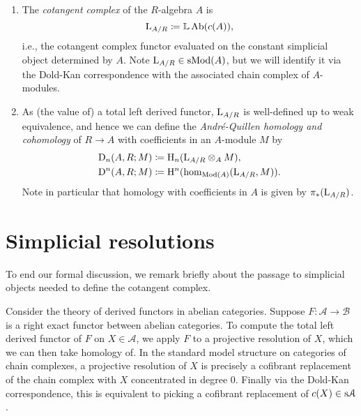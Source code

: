\begin{definitions}
  \begin{enumerate}[leftmargin=*]
  \item The \emph{cotangent complex} of the $R$-algebra
    $A$ is
    \[
    \mathrm{L}_{A/R} \coloneqq \mathbb{L}\operatorname{Ab}(c(A)),
    \]
    i.e., the cotangent complex functor evaluated on the constant
    simplicial object determined by $A$. Note $\mathrm{L}_{A/R} \in
    \mathrm{s}\mathrm{Mod}(A)$, but we will identify it via the Dold-Kan
    correspondence with the associated chain complex of $A$-modules.
  \item As (the value of) a total left derived functor, $\mathrm{L}_{A/R}$
    is well-defined up to weak equivalence, and hence we can define
    the \emph{Andr\'e-Quillen homology and cohomology} of $R \to A$
    with coefficients in an $A$-module $M$ by
    \begin{align*}
    \mathrm{D}_n(A,R;M) &\coloneqq \mathrm{H}_n(\mathrm{L}_{A/R} \otimes_A M),\\ \mathrm{D}^n(A,R;M)
    &\coloneqq \mathrm{H}^n(\operatorname{hom}_{\mathrm{Mod}(A)}(\mathrm{L}_{A/R}, M)).
    \end{align*}
    Note in particular that homology with coefficients in $A$ is given
    by $\pi_*(\mathrm{L}_{A/R})$.
  \end{enumerate}
\end{definitions}


\section{Simplicial resolutions}

To end our formal discussion, we remark briefly about the passage to
simplicial objects needed to define the cotangent complex.

\renewcommand{\A}{\mathcal{A}}
\renewcommand{\B}{\mathcal{B}}

Consider the theory of derived functors in abelian categories. Suppose
$F : \A \to \B$ is a right exact functor between abelian
categories. To compute the total left derived functor of $F$ on $X \in
\A$, we apply $F$ to a projective resolution of $X$, which we can then
take homology of. In the standard model structure on categories of
chain complexes, a projective resolution of $X$ is precisely a
cofibrant replacement of the chain complex with $X$ concentrated in
degree $0$. Finally via the Dold-Kan correspondence, this is
equivalent to picking a cofibrant replacement of $c(X) \in \s\A$.

